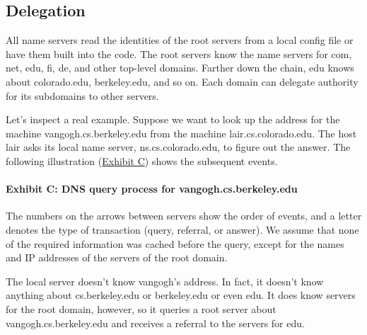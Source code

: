 \protect\hypertarget{part0024_split_015.html}{}{}

\hypertarget{part0024_split_015.htmlux5cux23_idContainer1069}{}
\hypertarget{part0024_split_015.htmlux5cux23calibre_pb_14}{%
\subsection[Delegation]{\texorpdfstring{\protect\hypertarget{part0024_split_015.htmlux5cux23_idTextAnchor859}{}{}Delegation}{Delegation}}\label{part0024_split_015.htmlux5cux23calibre_pb_14}}

\protect\hypertarget{part0024_split_015.htmlux5cux23_idIndexMarker2035}{}{}All
name servers read the identities of
the\protect\hypertarget{part0024_split_015.htmlux5cux23_idIndexMarker2036}{}{}\protect\hypertarget{part0024_split_015.htmlux5cux23_idIndexMarker2037}{}{}
root servers from a local config file or have them built into the code.
The root servers know the name servers for com, net, edu, fi, de, and
other top-level domains. Farther down the chain, edu knows about
colorado.edu, berkeley.edu, and so on. Each domain can delegate
authority for its subdomains to other servers.

Let's inspect a real example. Suppose we want to look up the address for
the machine vangogh.cs.berkeley.edu from the machine
lair.cs.colorado.edu. The host lair asks its local name server,
ns.cs.colorado.edu, to figure out the answer. The following illustration
(\protect\hyperlink{part0024_split_015.htmlux5cux23_idTextAnchor860}{Exhibit
C}) shows the subsequent events.

\paragraph[{Exhibit C: }DNS query process for
vangogh.cs.berkeley.edu]{\texorpdfstring{{Exhibit C:
}\protect\hypertarget{part0024_split_015.htmlux5cux23_idTextAnchor860}{}{}DNS
query process for
vangogh.cs.berkeley.edu}{Exhibit C: DNS query process for vangogh.cs.berkeley.edu}}


The numbers on the arrows between servers show the order of events, and
a letter denotes the type of transaction (query, referral, or answer).
We assume that none of the required information was cached before the
query, except for the names and IP addresses of the servers of the root
domain.

The local server doesn't know vangogh's address. In fact, it doesn't
know anything about cs.berkeley.edu or berkeley.edu or even edu. It does
know servers for the root domain, however, so it queries a root server
about vangogh.cs.berkeley.edu and receives a referral to the servers for
edu.

